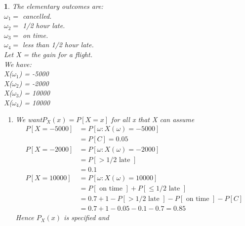 \documentclass[11pt]{article}
\newtheorem*{solution}{\framebox{Sol}}
\newcommand\tab[1][1cm]{\hspace*{#1}}
\begin{document}
            \begin{solution}
                The elementary outcomes are: \\
                \tab $\omega_1 = $ cancelled. \\
                \tab $\omega_2 = $ 1/2 hour late. \\
                \tab $\omega_3 = $ on time. \\
                \tab $\omega_4 = $ less than 1/2 hour late. \\
                Let X = the gain for a flight.\\
                We have: \\
                \tab X($\omega_1$) = -5000\\
                \tab X($\omega_2$) = -2000\\
                \tab X($\omega_3$) = 10000\\
                \tab X($\omega_4$) = 10000\\
                \begin{enumerate}
                    \item We want$P_X(x) = P[X = x] $ for all x that X can assume
                            \begin{align*}
                                P[X = -5000]    &= P[\omega : X(\omega) = -5000]\\
                                                &= P[C] = 0.05\\
                                P[X = -2000]    &= P[\omega : X(\omega) = -2000]\\
                                                &= P[> 1/2 \text{ late }] \\
                                                &= 0.1\\
                                P[X = 10000]    &= P[\omega : X(\omega) = 10000]\\
                                                &= P[\text{ on time }] + P[\leq 1/2 \text{ late }]\\
                                                &= 0.7 + 1 - P[> 1/2 \text{ late }]- P[\text{ on time }] - P[C]\\
                                                &= 0.7 + 1 - 0.05 - 0.1 - 0.7 
                                                = 0.85
                            \end{align*}
                            Hence $P_X(x)$ is specified and \\

\end{enumerate}
\end{solution}
\end{document}
